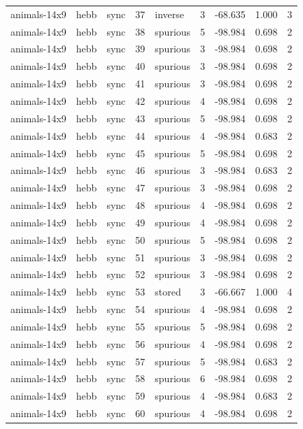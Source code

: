 \begin{tabular}{lllrlrrrr}
animals-14x9 & hebb & sync & 37 & inverse & 3 & -68.635 & 1.000 & 3 \\
animals-14x9 & hebb & sync & 38 & spurious & 5 & -98.984 & 0.698 & 2 \\
animals-14x9 & hebb & sync & 39 & spurious & 3 & -98.984 & 0.698 & 2 \\
animals-14x9 & hebb & sync & 40 & spurious & 3 & -98.984 & 0.698 & 2 \\
animals-14x9 & hebb & sync & 41 & spurious & 3 & -98.984 & 0.698 & 2 \\
animals-14x9 & hebb & sync & 42 & spurious & 4 & -98.984 & 0.698 & 2 \\
animals-14x9 & hebb & sync & 43 & spurious & 5 & -98.984 & 0.698 & 2 \\
animals-14x9 & hebb & sync & 44 & spurious & 4 & -98.984 & 0.683 & 2 \\
animals-14x9 & hebb & sync & 45 & spurious & 5 & -98.984 & 0.698 & 2 \\
animals-14x9 & hebb & sync & 46 & spurious & 3 & -98.984 & 0.683 & 2 \\
animals-14x9 & hebb & sync & 47 & spurious & 3 & -98.984 & 0.698 & 2 \\
animals-14x9 & hebb & sync & 48 & spurious & 4 & -98.984 & 0.698 & 2 \\
animals-14x9 & hebb & sync & 49 & spurious & 4 & -98.984 & 0.698 & 2 \\
animals-14x9 & hebb & sync & 50 & spurious & 5 & -98.984 & 0.698 & 2 \\
animals-14x9 & hebb & sync & 51 & spurious & 3 & -98.984 & 0.698 & 2 \\
animals-14x9 & hebb & sync & 52 & spurious & 3 & -98.984 & 0.698 & 2 \\
animals-14x9 & hebb & sync & 53 & stored & 3 & -66.667 & 1.000 & 4 \\
animals-14x9 & hebb & sync & 54 & spurious & 4 & -98.984 & 0.698 & 2 \\
animals-14x9 & hebb & sync & 55 & spurious & 5 & -98.984 & 0.698 & 2 \\
animals-14x9 & hebb & sync & 56 & spurious & 4 & -98.984 & 0.698 & 2 \\
animals-14x9 & hebb & sync & 57 & spurious & 5 & -98.984 & 0.683 & 2 \\
animals-14x9 & hebb & sync & 58 & spurious & 6 & -98.984 & 0.698 & 2 \\
animals-14x9 & hebb & sync & 59 & spurious & 4 & -98.984 & 0.683 & 2 \\
animals-14x9 & hebb & sync & 60 & spurious & 4 & -98.984 & 0.698 & 2 \\

\end{tabular}
